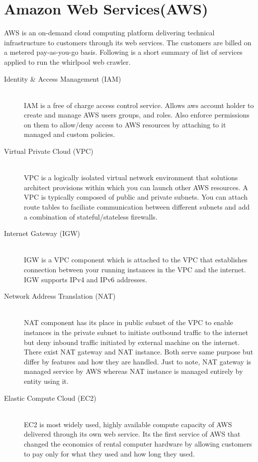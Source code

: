 
\section{Amazon Web Services(AWS)}
AWS is an on-demand cloud computing platform delivering technical infrastructure to customers through its
web services. The customers are billed on a metered pay-as-you-go basis. Following is a short summary of
list of services applied to run the whirlpool web crawler.

\begin{description}
  \item[Identity \& Access Management (IAM)] \hfill \\
    IAM is a free of charge access control service. Allows aws account holder to create and manage AWS
    users groups, and roles. Also enforce permissions on them to allow/deny access to AWS resources
    by attaching to it managed and custom policies.
  \item[Virtual Private Cloud (VPC)] \hfill \\
    VPC is a logically isolated virtual network environment that solutions architect provisions within
    which you can launch other AWS resources. A VPC is typically composed of public and private subnets.
    You can attach route tables to faciliate communication between different subnets and add a combination
    of stateful/stateless firewalls.

  \item[Internet Gateway (IGW)] \hfill \\
    IGW is a VPC component which is attached to the VPC that establishes connection between your running
    instances in the VPC and the internet. IGW supports IPv4 and IPv6 addresses.

  \item[Network Address Translation (NAT)] \hfill \\
    NAT component has its place in public subnet of the VPC to enable instances in the private subnet
    to initiate outbound traffic to the internet but deny inbound traffic initiated by external
    machine on the internet. There exist NAT gateway and NAT instance. Both serve same purpose but differ
    by features and how they are handled. Just to note, NAT gateway is managed service by AWS whereas
    NAT instance is managed entirely by entity using it.

  \item[Elastic Compute Cloud (EC2)] \hfill \\
    EC2 is most widely used, highly available compute capacity of AWS delivered through its own web
    service. Its the first service of AWS that changed the economics of rental computer hardware by
    allowing customers to pay only for what they used and how long they used.


\end{description}

